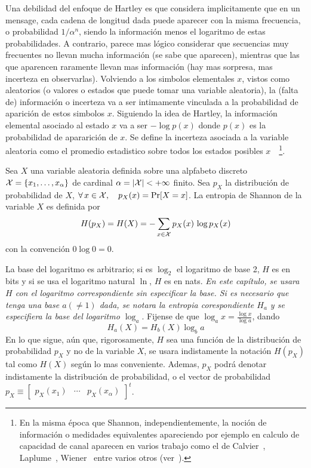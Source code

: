Una debilidad del  enfoque de Hartley es que considera  implicitamente que en un
mensage, cada cadena de longitud dada  puede aparecer con la misma frecuencia, o
probabilidad $1/\alpha^n$,  siendo la informaci\'on menos el  logaritmo de estas
probabilidades.  A contrario, parece  mas l\'ogico considerar que secuencias muy
frecuentes no  llevan mucha informaci\'on  (se sabe que aparecen),  mientras que
las  que aparencen  raramente llevan  mas informaci\'on  (hay mas  sorpresa, mas
incerteza  en observarlas).  Volviendo  a los  simbolos elementales  $x$, vistos
como aleatorios (o valores o estados que puede tomar una variable aleatoria), la
(falta  de)  informaci\'on o  incerteza  va a  ser  intimamente  vinculada a  la
probabilidad de aparici\'on de estos simbolos $x$. Siguiendo la idea de Hartley,
la informaci\'on elemental  asociado al estado $x$ va a ser  $- \log p(x)$ donde
$p(x)$  es la  probabilidad de  apararici\'on de  $x$.  Se  define  la incerteza
asociada a  la variable aleatoria como  el promedio estadistico  sobre todos los
estados  posibles $x$~\cite{Sha48, ShaWea64}~\footnote{En  la misma  \'epoca que
  Shannon,  independientemente,   la  noci\'on  de   informaci\'on  o  medidades
  equivalentes apareciendo por ejemplo en calculo de capacidad de canal aparecen
  en  varios  trabajo  como  el de  Calvier~\cite{Cla48},  Laplume~\cite{Lap48},
  Wiener~\cite[Cap.~III]{Wie48}  entre  varios  otros  (ver~\cite{Ver98,  Lun02,
    RioMag14, FlaRio16, RioFla17, Che17}).}.
%
\begin{definicion}\label{def:SZ:Shannon}
  Sea $X$ una variable aleatoria definida  sobre una alpfabeto discreto $\mathcal{X} = \{
  x_1 , \ldots , x_\alpha \}$ de cardinal $\alpha = |\mathcal{X}| < + \infty$ finito. Sea
  $p_X$ la  distribuci\'on de probabilidad  de $X$, \ie  $ \forall \, x  \in \mathcal{X},
  \quad p_X(x)  = \Pr[X  = x]$.  La entropia de  Shannon de  la variable  $X$ es
  definida por
  \[
    H(p_X) = H(X) = - \sum_{x \in \mathcal{X}} p_X(x) \, \log p_X(x)
  \]
  con la convenci\'on $0 \log 0 = 0$.
\end{definicion}

La base del logaritmo es arbitrario; si  es $\log_2$ el logaritmo de base 2, $H$
es en bits y si se usa el logaritmo natural $\ln$, $H$ es en nats.  {\it En este
  cap\'itulo, se usara  $H$ con el logaritmo correspondiente  sin especificar la
  base.  Si  es necesario  que tenga  una base $a  (\ne 1)$  dada, se  notara la
  entropia  corespondiente  $H_a$  y   se  especifiera  la  base  del  logaritmo
  $\log_a$}.  Fijense de que $\log_a x = \frac{\log x}{\log a}$, dando
%
\[
H_a(X)  =  H_b(X)  \log_b  a
\]
%
En  lo  que  sigue, a\'un  que,  rigorosamente,  $H$  sea  una funci\'on  de  la
distribuci\'on  de  probabilidad  $p_X$  y  no  de la  variable  $X$,  se  usara
indistamente la notaci\'on $H(p_X)$ tal  como $H(X)$ seg\'un lo mas conveniente.
Ademas, $p_X$ podr\'a denotar  indistamente la distribuci\'on de probabilidad, o
el  vector  de probabilidad  $p_X  \equiv  \begin{bmatrix}  p_X(x_1) &  \cdots  &
  p_X(x_\alpha) \end{bmatrix}^t$.

